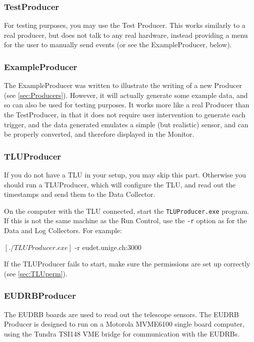 \subsubsection{TestProducer}
For testing purposes, you may use the Test Producer.
This works similarly to a real producer, but does not talk to any real hardware,
instead providing a menu for the user to manually send events
(or see the ExampleProducer, below).

\subsubsection{ExampleProducer}
The ExampleProducer was written to illustrate the writing of a new Producer (see \autoref{sec:Producers}).
However, it will actually generate some example data, and so can also be used for testing purposes.
It works more like a real Producer than the TestProducer,
in that it does not require user intervention to generate each trigger,
and the data generated emulates a simple (but realistic) sensor,
and can be properly converted, and therefore displayed in the Monitor.

\subsubsection{TLUProducer}
If you do not have a \gls{TLU} in your setup, you may skip this part.
Otherwise you should run a TLUProducer, which will configure the \gls{TLU},
and read out the timestamps and send them to the Data Collector.

On the computer with the \gls{TLU} connected, start the \texttt{TLUProducer.exe} program.
If this is not the same machine as the Run Control,
use the \texttt{-r} option as for the Data and Log Collectors.
For example:
\begin{listing}[mybash]
$[./TLUProducer.exe]$ -r eudet.unige.ch:3000
\end{listing}

If the TLUProducer fails to start, make sure the permissions are set up correctly (see \autoref{sec:TLUperm}).

\subsubsection{EUDRBProducer}
The \gls{EUDRB} boards are used to read out the telescope sensors.
The \gls{EUDRB} Producer is designed to run on a Motorola MVME6100 single board computer,
using the Tundra TSI148 VME bridge for communication with the \glspl{EUDRB}.


